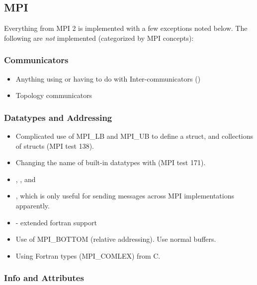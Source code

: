 \subsection{MPI}
\label{subsec:issues:mpi}

Everything from MPI 2 is implemented with a few exceptions noted below.  
The following are \textit{not} implemented (categorized by MPI concepts):

\subsubsection{Communicators}
\label{subsubsec:issues:mpi:comm}

\begin{itemize}
\item Anything using or having to do with Inter-communicators ()
\item Topology communicators
\end{itemize}

\subsubsection{Datatypes and Addressing}
\label{subsubsec:issues:mpi:types}

\begin{itemize}
\item Complicated use of MPI\_LB and MPI\_UB to define a struct, and collections of structs (MPI test 138). 
\item Changing the name of built-in datatypes with  (MPI test 171).
\item {}, , and 
\item {}, which is only useful for sending messages across MPI implementations apparently.
\item {}  - extended fortran support
\item Use of MPI\_BOTTOM (relative addressing).  Use normal buffers. 
\item Using Fortran types (\eg MPI\_COMLEX) from C.
\end{itemize}


\subsubsection{Info and Attributes}
\label{subsubsec:issues:mpi:info}

